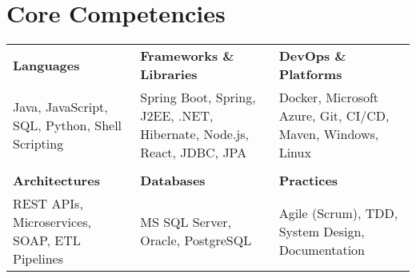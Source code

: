 \section*{Core Competencies}

\renewcommand{\arraystretch}{1.2}
\begin{longtable}{p{} p{} p{}}
\textbf{Languages} & \textbf{Frameworks \& Libraries} & \textbf{DevOps \& Platforms} \\
Java, JavaScript, SQL, Python, Shell Scripting
& Spring Boot, Spring, J2EE, .NET, Hibernate, Node.js, React, JDBC, JPA
& Docker, Microsoft Azure, Git, CI/CD, Maven, Windows, Linux \\
\\[-1em]
\textbf{Architectures} & \textbf{Databases} & \textbf{Practices} \\
REST APIs, Microservices, SOAP, ETL Pipelines
& MS SQL Server, Oracle, PostgreSQL
& Agile (Scrum), TDD, System Design, Documentation \\
\end{longtable}
